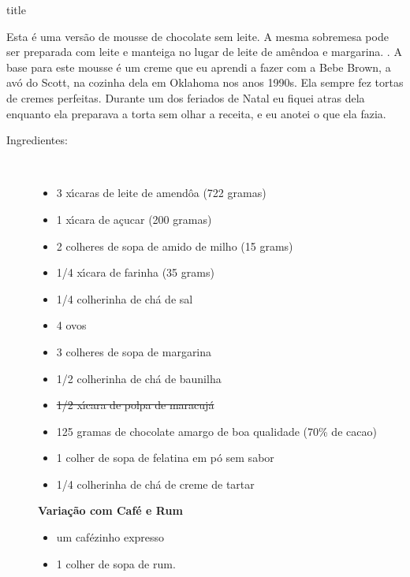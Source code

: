 \documentclass [11pt, letterpaper] {article}
\begin{document}
 {title}

 Esta \'e uma vers\~ao de mousse de chocolate sem leite. A mesma sobremesa pode ser preparada com leite e manteiga no lugar de leite de am\^endoa e margarina. .
A base para este mousse \'e um creme que eu aprendi a fazer com a Bebe Brown, a av\'o do Scott, na cozinha dela em Oklahoma nos anos 1990s. Ela sempre fez tortas de cremes perfeitas. Durante um dos feriados de Natal eu fiquei atras dela enquanto ela preparava a torta sem olhar a receita, e eu anotei o que ela fazia. 

\vspace{0.3in}
\begin{description}

\item[Ingredientes:]\ \\
	\begin{itemize}
	\item 3 x\'{\i}caras de leite de amend\^oa  (722 gramas)
	\item 1 x\'{\i}cara de a\c{c}ucar (200 gramas)
	\item 2 colheres de sopa de amido de milho (15 grams)
	\item 1/4 x\'{\i}cara de farinha (35 grams)
	\item 1/4 colherinha de ch\'a de sal
	\item 4 ovos
	\item 3 colheres de sopa de margarina
	\item 1/2 colherinha de ch\'a de baunilha 
	\item \st{1/2 x\'{\i}cara de polpa de maracuj\'a}
	\item 125 gramas de chocolate amargo de boa qualidade (70\% de cacao)
	\item 1 colher de sopa de felatina em p\'o sem sabor
	\item 1/4 colherinha de ch\'a de creme de tartar
	\end{itemize}
	
	{\bf Varia\c{c}\~ao com Caf\'e e Rum}
	\begin{itemize}
	\item um caf\'ezinho expresso
	\item 1 colher de sopa de rum.
	\end{itemize}
	

\end{description}
\end{document}
